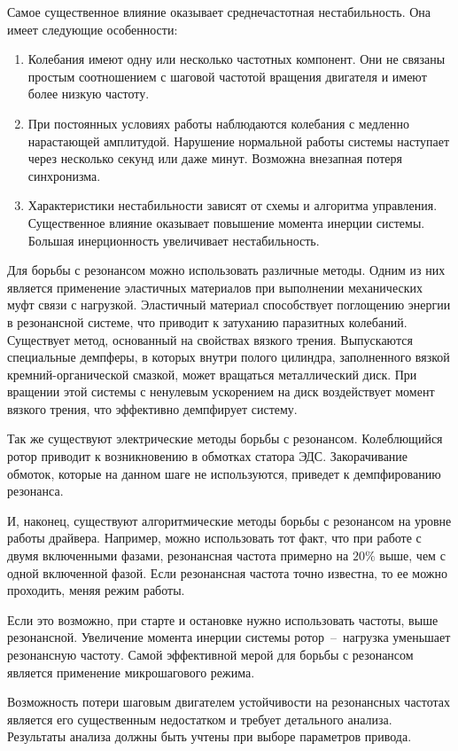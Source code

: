 Самое существенное влияние оказывает среднечастотная нестабильность. Она имеет следующие особенности:
\begin{enumerate}
    \item Колебания имеют одну или несколько частотных компонент. Они не связаны простым соотношением с
            шаговой частотой вращения двигателя и имеют более низкую частоту.

    \item При постоянных условиях работы наблюдаются колебания с медленно нарастающей амплитудой.
            Нарушение нормальной работы системы наступает через несколько секунд или даже минут.
            Возможна внезапная потеря синхронизма.

    \item Характеристики нестабильности зависят от схемы и алгоритма управления.
            Существенное влияние оказывает повышение момента инерции системы.
            Большая инерционность увеличивает нестабильность.
\end{enumerate}

Для борьбы с резонансом можно использовать различные методы. Одним из них является применение
эластичных материалов при выполнении механических муфт связи с нагрузкой. Эластичный материал
способствует поглощению энергии в резонансной системе, что приводит к затуханию паразитных колебаний.
Существует метод, основанный на свойствах вязкого трения. Выпускаются специальные демпферы, в которых
внутри полого цилиндра, заполненного вязкой кремний-органической смазкой, может вращаться
металлический диск. При вращении этой системы с ненулевым ускорением на диск воздействует момент вязкого
трения, что эффективно демпфирует систему.

Так же существуют электрические методы борьбы с резонансом. Колеблющийся ротор приводит к возникновению в
обмотках статора ЭДС. Закорачивание обмоток, которые на данном шаге не используются, приведет к
демпфированию резонанса.

И, наконец, существуют алгоритмические методы борьбы с резонансом на уровне работы драйвера. Например,
можно использовать тот факт, что при работе с двумя включенными фазами, резонансная частота примерно
на $20\%$ выше, чем с одной включенной фазой. Если резонансная частота точно известна, то ее можно
проходить, меняя режим работы.

Если это возможно, при старте и остановке нужно использовать частоты, выше резонансной. Увеличение
момента инерции системы ротор~--~нагрузка уменьшает резонансную частоту.
Самой эффективной мерой для борьбы с резонансом является применение микрошагового режима.

Возможность потери шаговым двигателем устойчивости на резонансных частотах является его существенным
недостатком и требует детального анализа. Результаты анализа должны быть учтены при выборе
параметров привода.
